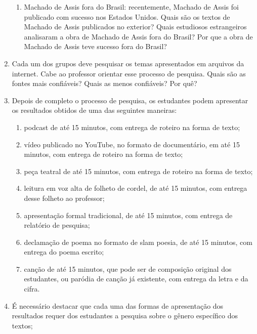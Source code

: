 \documentclass[12pt]{extarticle}
\begin{document}
\begin{enumerate}
\begin{enumerate}
\item Machado de Assis fora do Brasil: recentemente, Machado de Assis foi
publicado com sucesso nos Estados Unidos. Quais são os textos de Machado
de Assis publicados no exterior? Quais estudiosos estrangeiros
analisaram a obra de Machado de Assis fora do Brasil? Por que a obra de
Machado de Assis teve sucesso fora do Brasil?
\end{enumerate}

\item
Cada um dos grupos deve pesquisar os temas apresentados em arquivos
da internet. Cabe ao professor orientar esse processo de pesquisa. Quais
são as fontes mais confiáveis? Quais as menos confiáveis? Por quê?

\item
Depois de completo o processo de pesquisa, os estudantes podem
apresentar os resultados obtidos de uma das seguintes maneiras:

\begin{enumerate}
\item podcast de até 15 minutos, com entrega de roteiro na forma de texto;

\item vídeo publicado no YouTube, no formato de documentário, em até 15
minutos, com entrega de roteiro na forma de texto;

\item peça teatral de até 15 minutos, com entrega de roteiro na forma de
texto;

\item leitura em voz alta de folheto de cordel, de até 15 minutos, com
entrega desse folheto ao professor;

\item apresentação formal tradicional, de até 15 minutos, com entrega de
relatório de pesquisa;

\item declamação de poema no formato de slam poesia, de até 15 minutos, com
entrega do poema escrito;

\item canção de até 15 minutos, que pode ser de composição original dos
estudantes, ou paródia de canção já existente, com entrega da letra e da
cifra.
\end{enumerate}

\item
É necessário destacar que cada uma das formas de apresentação dos
resultados requer dos estudantes a pesquisa sobre o gênero específico
dos textos;


\end{enumerate}
\end{document}
